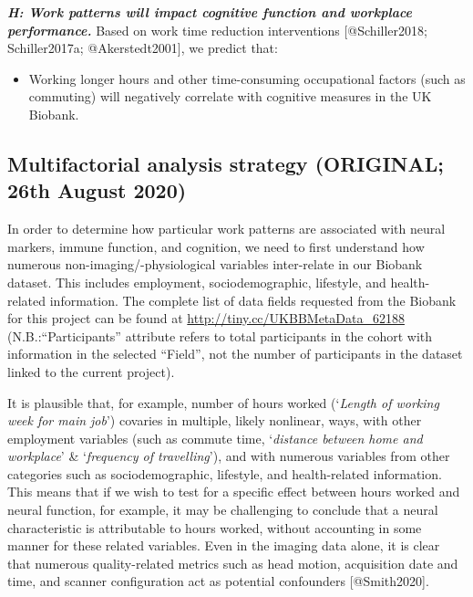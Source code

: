 \documentclass[
]{article}
\providecommand{\tightlist}{%
  \setlength{\itemsep}{0pt}\setlength{\parskip}{0pt}}
\begin{document}
\hspace{1cm}

\textbf{\emph{H: Work patterns will impact cognitive function and
workplace performance.}} Based on work time reduction interventions
{[}@Schiller2018; Schiller2017a; @Akerstedt2001{]}, we predict that:

\begin{itemize}
\tightlist
\item
  Working longer hours and other time-consuming occupational factors
  (such as commuting) will negatively correlate with cognitive measures
  in the UK Biobank.
\end{itemize}

\newpage

\hypertarget{multifactorial-analysis-strategy-original-26th-august-2020}{%
\subsection{Multifactorial analysis strategy (ORIGINAL; 26th August
2020)}\label{multifactorial-analysis-strategy-original-26th-august-2020}}

In order to determine how particular work patterns are associated with
neural markers, immune function, and cognition, we need to first
understand how numerous non-imaging/-physiological variables
inter-relate in our Biobank dataset. This includes employment,
sociodemographic, lifestyle, and health-related information. The
complete list of data fields requested from the Biobank for this project
can be found at \url{http://tiny.cc/UKBBMetaData_62188}
(N.B.:``Participants'' attribute refers to total participants in the
cohort with information in the selected ``Field'', not the number of
participants in the dataset linked to the current project).

It is plausible that, for example, number of hours worked (`\emph{Length
of working week for main job}') covaries in multiple, likely nonlinear,
ways, with other employment variables (such as commute time,
`\emph{distance between home and workplace}' \& `\emph{frequency of
travelling}'), and with numerous variables from other categories such as
sociodemographic, lifestyle, and health-related information. This means
that if we wish to test for a specific effect between hours worked and
neural function, for example, it may be challenging to conclude that a
neural characteristic is attributable to hours worked, without
accounting in some manner for these related variables. Even in the
imaging data alone, it is clear that numerous quality-related metrics
such as head motion, acquisition date and time, and scanner
configuration act as potential confounders {[}@Smith2020{]}.
\end{document}
